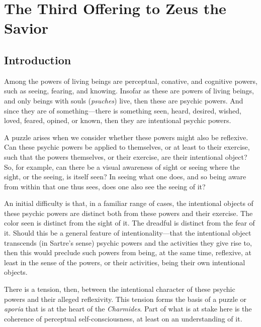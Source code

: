 \chapter{The Third Offering to Zeus the Savior} %
\label{cha:offering}

\section{Introduction} %
\label{sec:introduction_plato}

Among the powers of living beings are perceptual, conative, and cognitive powers, such as seeing, fearing, and knowing. Insofar as these are powers of living beings, and only beings with souls (\emph{psuches}) live, then these are psychic powers. And since they are of something—there is something seen, heard, desired, wished, loved, feared, opined, or known, then they are intentional psychic powers.

A puzzle arises when we consider whether these powers might also be reflexive. Can these psychic powers be applied to themselves, or at least to their exercise, such that the powers themselves, or their exercise, are their intentional object? So, for example, can there be a visual awareness of sight or seeing where the sight, or the seeing, is itself seen? In seeing what one does, and so being aware from within that one thus sees, does one also see the seeing of it? 

An initial difficulty is that, in a familiar range of cases, the intentional objects of these psychic powers are distinct both from these powers and their exercise. The color seen is distinct from the sight of it. The dreadful is distinct from the fear of it. Should this be a general feature of intentionality—that the intentional object transcends (in Sartre's sense) psychic powers and the activities they give rise to, then this would preclude such powers from being, at the same time, reflexive, at least in the sense of the powers, or their activities, being their own intentional objects.

There is a tension, then, between the intentional character of these psychic powers and their alleged reflexivity. This tension forms the basis of a puzzle or \emph{aporia} that is at the heart of the \emph{Charmides}. Part of what is at stake here is the coherence of perceptual self-consciousness, at least on an understanding of it.

